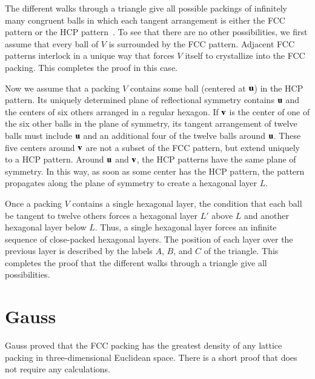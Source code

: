 The different walks through a triangle give all possible packings of
infinitely many congruent balls in which each tangent arrangement is
either the FCC pattern or the HCP pattern~\cite{CoSl95}.  To see that
there are no other possibilities, we first assume that every ball of
$V$ is surrounded by the FCC pattern.  Adjacent FCC patterns interlock
in a unique way that forces $V$ itself to crystallize into the FCC
packing.  This completes the proof in this case.

Now we assume that a packing $V$ contains some ball (centered at ${\mathbf u}$)
in the HCP pattern. Its uniquely determined
plane of reflectional symmetry contains ${\mathbf u}$ and the centers of six
others arranged in a regular hexagon. If ${\mathbf v}$ is the center of one of
the six other balls in the plane of symmetry, its  tangent arrangement
of twelve balls must include ${\mathbf u}$ and an additional four of the
twelve balls around ${\mathbf u}$. These five centers around ${\mathbf v}$ are not a
subset of the FCC pattern, but  extend uniquely to
a HCP pattern.   Around ${\mathbf u}$ and ${\mathbf v}$, the HCP patterns  have the same
plane of symmetry. In this way, as
soon as some center has the HCP pattern, the pattern
propagates along the plane of symmetry to create a hexagonal layer
$L$.

Once a packing $V$ contains a single hexagonal layer, the condition
that each ball be tangent to twelve others forces a hexagonal layer
$L'$ above $L$ and another hexagonal layer below $L$.  Thus, a single
hexagonal layer forces an infinite sequence of close-packed hexagonal
layers.  The position of each layer over the previous layer is described 
by the labels $A$, $B$, and $C$ of the triangle.
This completes the proof that the different walks through a triangle give
all possibilities.



\section{Gauss}

Gauss proved that the FCC packing has the greatest density
of any lattice packing in three-dimensional Euclidean space.  There is a
short proof that does not require any calculations.

